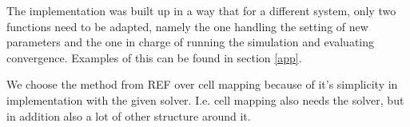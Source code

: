 The implementation was built up in a way that for a different system, only two functions need to be adapted, namely the one handling the setting of new parameters and the one 
in charge of running the simulation and evaluating convergence. Examples of this can be found in section \ref{app}.







We choose the method from REF over cell mapping because of it's simplicity in implementation with the given solver. 
I.e. cell mapping also needs the solver, but in addition also a lot of other structure around it. 



